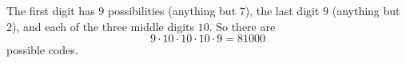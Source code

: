 The first digit has $9$ possibilities (anything but $7$), the last digit $9$ (anything but $2$), and each of the three middle digits $10$. So there are
\[
9\cdot10\cdot10\cdot10\cdot9=\boxed{81000}
\]
possible codes.
